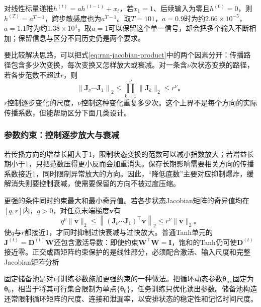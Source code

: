 \begin{example}[传播距离与状态保留]
  \label{ex:rnn-memory-decay}
  对线性标量递推$h^{(t)}=a h^{(t-1)}+x_t$，若$x_1=1$、后续输入为零且$h^{(0)}=0$，则$h^{(T)}=a^{T-1}$，跨步敏感度也为$a^{T-1}$。取$T=101$，$a=0.9$时为约$2.66\times10^{-5}$，$a=1.1$时为约$1.38\times10^4$。取$a=1$可以保留这个单一信号，却会把多个输入不断相加；保留信息与区分不同历史仍是两个要求。
\end{example}

要比较解决思路，可以把式\eqref{eq:rnn-jacobian-product}中的两个因素分开：传播路径包含多少次变换，每次变换又怎样放大或衰减。对一条含$\nu$次状态变换的路径，若各步范数不超过$r$，则
\begin{equation}
  \left\lVert\bm J_{\nu}\cdots\bm J_1\right\rVert_2
    \leq\prod_{k=1}^{\nu}\lVert\bm J_k\rVert_2\leq r^{\nu}\text{。}
  \label{eq:rnn-path-length-rate}
\end{equation}
$r$控制逐步变化的尺度，$\nu$控制这种变化重复多少次。这个上界不是每个方向的实际传播系数，但能帮助区分下面几类设计。

\subsubsection{参数约束：控制逐步放大与衰减}
\label{sec:rnn-parameter-constraints}

若传播方向的增益长期大于1，限制状态变换的范数可以减小指数放大；若增益长期小于1，只把范数压得更小反而会加重消失。保存长期影响需要相关方向的传播系数接近1，同时限制异常放大的方向。因此，“降低底数”主要对应抑制爆炸，缓解消失则要控制衰减，使需要保留的方向不被过度压缩。

更强的条件同时约束最大和最小奇异值。若各步状态Jacobian矩阵的奇异值均在$[q,r]$内，$q>0$，对任意末端梯度$\bm v$有
\begin{equation}
  q^{\nu}\lVert\bm v\rVert_2
    \leq\left\lVert(\bm J_{\nu}\cdots\bm J_1)^{\top}\bm v\right\rVert_2
    \leq r^{\nu}\lVert\bm v\rVert_2\text{。}
  \label{eq:rnn-path-singular-bounds}
\end{equation}
使$q$与$r$都接近1，才同时抑制过快衰减与过快放大。普通Tanh单元的$\bm J^{(t)}=\bm D^{(t)}\bm W$还包含激活导数：即使约束$\bm W^{\top}\bm W=\bm I$，饱和的Tanh仍可使$\bm D^{(t)}$接近零。正交或酉矩阵约束保护的是线性部分，必须配合激活、输入尺度和完整Jacobian矩阵分析

固定储备池是对可训练参数施加更强约束的一种做法。把循环动态参数$\bm\theta_{\mathrm{res}}$固定为$\bm\theta_0$，相当于将其可行集合限制为单点$\{\bm\theta_0\}$，任务训练只优化读出参数。储备池构造还常限制循环矩阵的尺度、连接和泄漏率，以安排状态的稳定性和记忆时间尺度。

